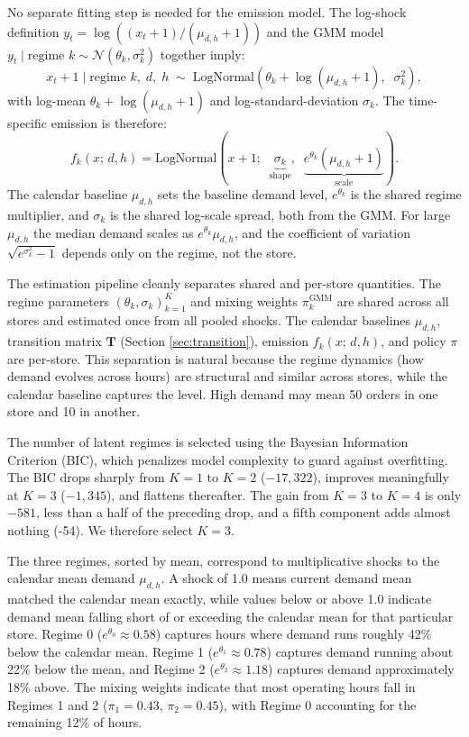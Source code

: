 \documentclass[preprint,11pt,authoryear]{elsarticle}
\newcommand{\bvec}[1]{\mathbf{#1}}
\theoremstyle{remark}
\begin{document}
No separate fitting step is needed for the emission model. The log-shock definition $y_t = \log\left((x_t + 1)/(\mu_{d,h}+1)\right)$ and the GMM model $y_t \mid \text{regime }k \sim \mathcal{N}(\theta_k, \sigma_k^2)$ together imply:
\begin{equation}
    x_t + 1 \mid \text{regime } k,\; d,\; h \;\sim\;
    \mathrm{LogNormal}\!\left(\theta_k + \log(\mu_{d,h}+1),\;\; \sigma_k^2\right),
    \label{eq:x_given_k}
\end{equation}
with log-mean $\theta_k + \log(\mu_{d,h}+1)$ and log-standard-deviation $\sigma_k$. The time-specific emission is therefore:
\begin{equation}
    f_k(x;\, d, h) =
    \mathrm{LogNormal}\!\left(x+1;\;\;
    \underbrace{\sigma_k}_{\text{shape}},\;\;
    \underbrace{e^{\theta_k}(\mu_{d,h}+1)}_{\text{scale}}\right).
    \label{eq:emission}
\end{equation}
The calendar baseline $\mu_{d,h}$ sets the baseline demand level, $e^{\theta_k}$ is the shared regime multiplier, and $\sigma_k$ is the shared log-scale spread, both from the GMM. For large $\mu_{d,h}$ the median demand scales as $e^{\theta_k}\mu_{d,h}$, and the coefficient of variation $\sqrt{e^{\sigma_k^2}-1}$ depends only on the regime, not the store.

The estimation pipeline cleanly separates shared and per-store quantities. The regime parameters $(\theta_k, \sigma_k)_{k=1}^K$ and mixing weights $\pi_k^{\text{GMM}}$ are shared across all stores and estimated once from all pooled shocks. The calendar baselines $\mu_{d,h}$, transition matrix $\bvec{T}$ (Section \ref{sec:transition}), emission $f_k(x;\, d, h)$, and policy $\pi$ are per-store. This separation is natural because the regime dynamics (how demand evolves across hours) are structural and similar across stores, while the calendar baseline captures the level. High demand may mean 50 orders in one store and 10 in another.

The number of latent regimes is selected using the Bayesian Information Criterion (BIC), which penalizes model complexity to guard against overfitting. The BIC drops sharply from $K=1$ to $K=2$ ($-17{,}322$), improves meaningfully at $K=3$ ($-1{,}345$), and flattens thereafter. The gain from $K=3$ to $K=4$ is only $-581$, less than a half of the preceding drop, and a fifth component adds almost nothing (-54). We therefore select $K=3$.

The three regimes, sorted by mean, correspond to multiplicative shocks to the calendar mean demand $\mu_{d,h}$. A shock of 1.0 means current demand mean matched the calendar mean exactly, while values below or above 1.0 indicate demand mean falling short of or exceeding the calendar mean for that particular store. Regime 0 ($e^{\theta_0} \approx 0.58$) captures hours where demand runs roughly 42\% below the calendar mean. Regime 1 ($e^{\theta_1} \approx 0.78$) captures demand running about 22\% below the mean, and Regime 2 ($e^{\theta_2} \approx 1.18$) captures demand approximately 18\% above. The mixing weights indicate that most operating hours fall in Regimes 1 and 2 ($\pi_1 = 0.43$, $\pi_2 = 0.45$), with Regime 0 accounting for the remaining 12\% of hours.
\end{document}
